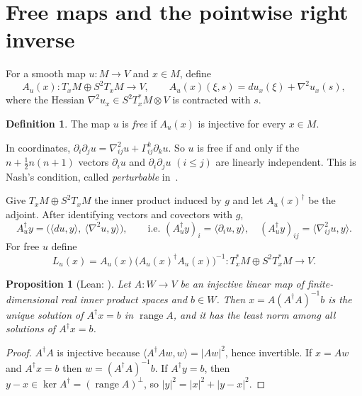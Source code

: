 \documentclass[11pt]{amsart}
\newtheorem{proposition}[theorem]{Proposition}
\theoremstyle{definition}
\newtheorem{definition}[theorem]{Definition}
\newcommand{\range}{\operatorname{range}}
\newcommand{\inner}[2]{\langle #1, #2\rangle}
\newcommand{\lean}[1]{\texttt{\detokenize{#1}}}
\begin{document}
\section{Free maps and the pointwise right inverse}\label{sec:right-inverse}

For a smooth map $u\colon M\to V$ and $x\in M$, define
\[
A_u(x)\colon T_xM\oplus S^2T_xM\to V,\qquad
A_u(x)(\xi,s) = du_x(\xi) + \nabla^2u_x(s),
\]
where the Hessian $\nabla^2u_x\in S^2T^*_xM\otimes V$ is contracted with $s$.

\begin{definition}
The map $u$ is \emph{free} if $A_u(x)$ is injective for every $x\in M$.
\end{definition}

In coordinates, $\partial_i\partial_ju = \nabla^2_{ij}u+\Gamma^k_{ij}\partial_ku$. So $u$ is free
if and only if the $n+\tfrac12n(n+1)$ vectors $\partial_iu$ and $\partial_i\partial_ju$
$(i\le j)$ are linearly independent. This is Nash's condition, called \emph{perturbable}
in~\cite{MS80}.

Give $T_xM\oplus S^2T_xM$ the inner product induced by $g$ and let $A_u(x)^\dagger$ be the
adjoint. After identifying vectors and covectors with $g$,
\begin{equation}\label{eq:adjoint}
A_u^\dagger y = \bigl(\inner{du}{y},\ \inner{\nabla^2u}{y}\bigr),\qquad
\text{i.e. } (A_u^\dagger y)_i = \inner{\partial_iu}{y},\quad (A_u^\dagger y)_{ij} = \inner{\nabla^2_{ij}u}{y}.
\end{equation}
For free $u$ define
\[
L_u(x) = A_u(x)\bigl(A_u(x)^\dagger A_u(x)\bigr)^{-1}\colon T^*_xM\oplus S^2T^*_xM\to V .
\]

\begin{proposition}[Lean: \lean{nash_gunther_right_inverse}]\label{prop:right-inverse}
Let $A\colon W\to V$ be an injective linear map of finite-dimensional real inner product spaces
and $b\in W$. Then $x=A(A^\dagger A)^{-1}b$ is the unique solution of $A^\dagger x=b$ in
$\range A$, and it has the least norm among all solutions of $A^\dagger x=b$.
\end{proposition}

\begin{proof}
$A^\dagger A$ is injective because $\inner{A^\dagger Aw}{w}=|Aw|^2$, hence invertible. If $x=Aw$
and $A^\dagger x=b$ then $w=(A^\dagger A)^{-1}b$. If $A^\dagger y=b$, then $y-x\in\ker
A^\dagger=(\range A)^\perp$, so $|y|^2=|x|^2+|y-x|^2$.
\end{proof}
\end{document}
